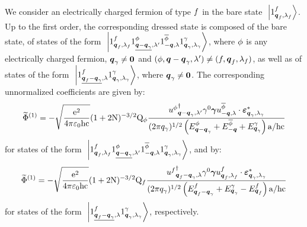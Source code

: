 \documentclass[10pt,a4paper,twoside,openany]{book}
\begin{document}
We consider an electrically charged fermion of type $f$ in the bare state $\ \left|{{1}^{f}_{{\boldsymbol{q}_f}, {\lambda_f}}}\right\rangle$. Up to the first order, the corresponding dressed state is composed of the bare state, of states of the form $\ \left|{{1}^{f}_{{\boldsymbol{q}_f}, {\lambda_f}} {1}^{\phi}_{{\underline{\boldsymbol{q}-\boldsymbol{q}_\gamma}}, {\lambda'}} {1}^{\overline{\phi}}_{{-\boldsymbol{q}}, {\lambda}} {1}^{\gamma}_{{\boldsymbol{q}_\gamma}, {\lambda_\gamma}}}\right\rangle$, where $\phi$ is any electrically charged fermion, $\boldsymbol{q}_\gamma \neq \boldsymbol{0}$ and $(\phi, \boldsymbol{q}-\boldsymbol{q}_\gamma, \lambda') \neq (f, \boldsymbol{q}_f, \lambda_f)$, as well as of states of the form $\ \left|{{1}^{f}_{{\underline{\boldsymbol{q}_f - \boldsymbol{q}_\gamma}}, {\lambda}} {1}^{\gamma}_{{\boldsymbol{q}_\gamma}, {\lambda_\gamma}}}\right\rangle$, where $\boldsymbol{q}_\gamma \neq \boldsymbol{0}$. The corresponding unnormalized coefficients  are given by:
\begin{equation*}
\widetilde{\Phi}^{(1)} = - \sqrt{\frac{\mathrm e^2}{4 \pi \mathrm \varepsilon_0 \mathrm h \mathrm c}} ( 1 + 2 \mathrm N )^{-3/2} \mathrm Q_{\phi} \frac{{u^{\phi}}^{\dagger}_{{\boldsymbol{q} - \boldsymbol{q}_\gamma}, {\lambda'}} \gamma^{0} \boldsymbol{\gamma} u^{\overline{\phi}}_{{-\boldsymbol{q}}, {\lambda}} \cdot \boldsymbol{\varepsilon}_{{\boldsymbol{q}_\gamma},{\lambda_\gamma}}^*}{( 2 \pi q_\gamma )^{1 / 2} \left( E^{\phi}_{\boldsymbol{q} - \boldsymbol{q}_\gamma} + E^{\overline{\phi}}_{-\boldsymbol{q}} + E^{\gamma}_{\boldsymbol{q}_\gamma} \right) \mathrm a / \mathrm h \mathrm c}
\end{equation*}
for states of the form $\ \left|{{1}^{f}_{{\boldsymbol{q}_f}, {\lambda_f}} {1}^{\phi}_{{\underline{\boldsymbol{q}-\boldsymbol{q}_\gamma}}, {\lambda'}} {1}^{\overline{\phi}}_{{-\boldsymbol{q}}, {\lambda}} {1}^{\gamma}_{{\boldsymbol{q}_\gamma}, {\lambda_\gamma}}}\right\rangle$, and by:
\begin{equation*}
\widetilde{\Phi}^{(1)} = - \sqrt{\frac{\mathrm e^2}{4 \pi \mathrm \varepsilon_0 \mathrm h \mathrm c}} ( 1 + 2 \mathrm N )^{-3/2} \mathrm Q_{f} \frac{{u^{f}}^{\dagger}_{{\boldsymbol{q}_f - \boldsymbol{q}_\gamma}, {\lambda}} \gamma^{0} \boldsymbol{\gamma} u^{f}_{{\boldsymbol{q}_f}, {\lambda_f}} \cdot \boldsymbol{\varepsilon}_{{\boldsymbol{q}_\gamma},{\lambda_\gamma}}^*}{( 2 \pi q_\gamma )^{1 / 2} \left( E^{f}_{\boldsymbol{q}_f - \boldsymbol{q}_\gamma} + E^{\gamma}_{\boldsymbol{q}_\gamma} - E^{f}_{\boldsymbol{q}_f} \right) \mathrm a / \mathrm h \mathrm c}
\end{equation*}
for states of the form $\ \left|{{1}^{f}_{{\underline{\boldsymbol{q}_f - \boldsymbol{q}_\gamma}}, {\lambda}} {1}^{\gamma}_{{\boldsymbol{q}_\gamma}, {\lambda_\gamma}}}\right\rangle$, respectively.
\end{document}
